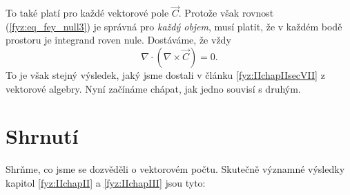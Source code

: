     To také platí pro každé vektorové pole \(\vec{C}\). Protože však rovnost 
    (\ref{fyz:eq_fey_null3}) je správná pro \emph{každý objem}, musí platit, že v každém bodě 
    prostoru je integrand roven nule. Dostáváme, že vždy
    \begin{equation}\label{fyz:eq_fey_null4}
     \nabla\cdot(\nabla\times\vec{C})=0.
    \end{equation}
    To je však stejný výsledek, jaký jsme dostali v článku \ref{fyz:IIchapIIsecVII} z vektorové 
    algebry. Nyní začínáme chápat, jak jedno souvisí s druhým.      
 
  \section{Shrnutí}
    Shrňme, co jsme se dozvěděli o vektorovém počtu. Skutečně významné výsledky kapitol
    \ref{fyz:IIchapII} a \ref{fyz:IIchapIII} jsou tyto:
